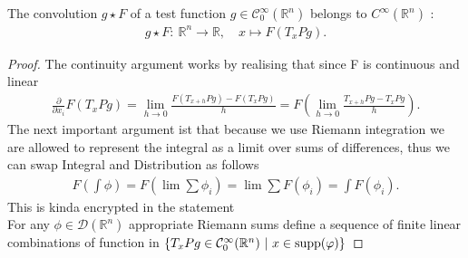 \begin{lemma}[2.12]
 The convolution $g \star F$ of a test function $g \in  \mathcal{C}_0^{\infty}(\mathbb{R}^{n} ) $ belongs to $C^{\infty}(\mathbb{R}^{n} ) $ : 
 \begin{align*}
  g \star F : \ \mathbb{R}^{n}  \to  \mathbb{R} , \quad x \mapsto F(T_xPg)
 .\end{align*}
\end{lemma}
\begin{proof}
 The continuity argument works by realising that since F is continuous and linear  
 \begin{align*}
   \frac{\partial }{\partial x_i} F(T_xPg) = \lim_{h\to 0} \frac{F(T_{x+h}Pg) - F(T_xPg)}{h} =  F(\lim_{h\to 0} \frac{T_{x+h}Pg - T_xPg}{h})
 .\end{align*}
 The next important argument ist that because we use Riemann integration we are allowed to represent the integral as a limit over sums of  differences, thus we can swap Integral and Distribution as follows 
 \begin{align*}
  F(\int  \phi ) = F(\lim \sum \phi_i) = \lim \sum F(\phi_i ) = \int F(\phi_i )
 .\end{align*}
 This is kinda encrypted in the statement \\[1ex]
 For any $\phi  \in  \mathcal{D}(\mathbb{R}^{n} )$ appropriate Riemann sums define a sequence of finite linear combinations of function in $\{T_xPg \in  \mathcal{C}_0^{\infty}(\mathbb{R}^{n}) \ | \ x \in  \operatorname*{supp}(\varphi ) \}  $
\end{proof}
